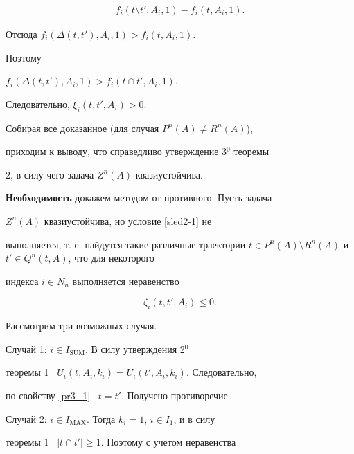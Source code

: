 \begin{pf}
\begin{gather*}
f_i( t \setminus t', A_i, 1)-f_i(t, A_i, 1).


\end{gather*}


Отсюда $f_i( \Delta(t, t'), A_i, 1)>f_i(t, A_i, 1)$.


Поэтому 


$f_i( \Delta(t, t'), A_i, 1)>f_i(t \cap t', A_i, 1)$.


Следовательно, $\xi_i(t, t', A_i)>0$.





Собирая все доказанное (для случая $ P^n(A) \neq R^n(A)$),


приходим к выводу, что справедливо утверждение 3$^0$ теоремы


2, в силу чего задача $Z^n(A)$ квазиустойчива.


\medskip





{\bf Необходимость} докажем методом от противного. Пусть задача


$Z^n(A)$ квазиустойчива, но условие \eqref{sled2-1} не


выполняется, т. е. найдутся такие различные траектории $t \in


P^n(A)\setminus R^n(A)$ и $ t'\in Q^n(t, A)$, что для некоторого


индекса $ i \in N_n$ выполняется неравенство


\begin{equation}\label{sled2-2}


\zeta_i(t, t', A_i)\leq 0.


\end{equation}





Рассмотрим три возможных случая.





Случай 1: $i \in I_{\mathrm{SUM}}$. В силу утверждения 2$^0$


теоремы 1 \ $U_i(t, A_i, k_i)=U_i(t', A_i, k_i)$. Следовательно,


по свойству \ref{pr3_1} \ $t=t'$. Получено противоречие.





Случай 2: $i \in I_{\mathrm{MAX}}$. Тогда $k_i=1$, $i \in I_1$, и в силу


теоремы 1 \ $|t \cap t'|\geq 1$. Поэтому с учетом неравенства



\end{pf}
